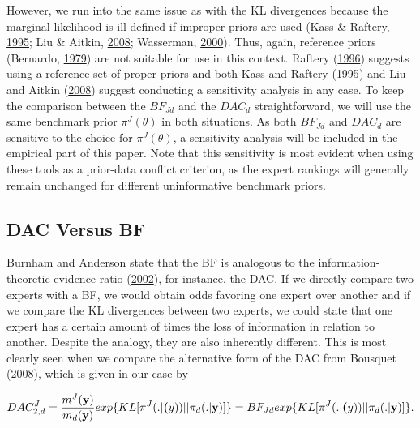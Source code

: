 \documentclass[openright,titlepage,12pt,a4paper]{book}
\begin{document}
However, we run into the same issue as with the KL divergences because the marginal likelihood is ill-defined if improper priors are used (Kass \& Raftery, \protect\hyperlink{ref-kass_bayes_1995}{1995}; Liu \& Aitkin, \protect\hyperlink{ref-liu_bayes_2008}{2008}; Wasserman, \protect\hyperlink{ref-wasserman_bayesian_2000}{2000}). Thus, again, reference priors (Bernardo, \protect\hyperlink{ref-bernardo_reference_1979}{1979}) are not suitable for use in this context. Raftery (\protect\hyperlink{ref-raftery_approximate_1996}{1996}) suggests using a reference set of proper priors and both Kass and Raftery (\protect\hyperlink{ref-kass_bayes_1995}{1995}) and Liu and Aitkin (\protect\hyperlink{ref-liu_bayes_2008}{2008}) suggest conducting a sensitivity analysis in any case. To keep the comparison between the \(BF_{Jd}\) and the \(DAC_d\) straightforward, we will use the same benchmark prior \(\pi^J(\theta)\) in both situations. As both \(BF_{Jd}\) and \(DAC_d\) are sensitive to the choice for \(\pi^J(\theta)\), a sensitivity analysis will be included in the empirical part of this paper. Note that this sensitivity is most evident when using these tools as a prior-data conflict criterion, as the expert rankings will generally remain unchanged for different uninformative benchmark priors.

\hypertarget{DACvsBF2}{%
\subsection{DAC Versus BF}\label{DACvsBF2}}

Burnham and Anderson state that the BF is analogous to the information-theoretic evidence ratio (\protect\hyperlink{ref-burnham_model_2002}{2002}), for instance, the DAC. If we directly compare two experts with a BF, we would obtain odds favoring one expert over another and if we compare the KL divergences between two experts, we could state that one expert has a certain amount of times the loss of information in relation to another. Despite the analogy, they are also inherently different. This is most clearly seen when we compare the alternative form of the DAC from Bousquet (\protect\hyperlink{ref-bousquet_diagnostics_2008}{2008}), which is given in our case by

\begin{equation} 
DAC_{2,d}^J = \frac{m^J(\textbf{y})}{m_d(\textbf{y})}exp\{KL[\pi^J(.|\textbf(y))||\pi_d(.|\textbf{y})]\} = BF_{Jd}exp\{KL[\pi^J(.|\textbf(y))||\pi_d(.|\textbf{y})]\}.
\label{eq:ch03eq7}
\end{equation}
\end{document}
